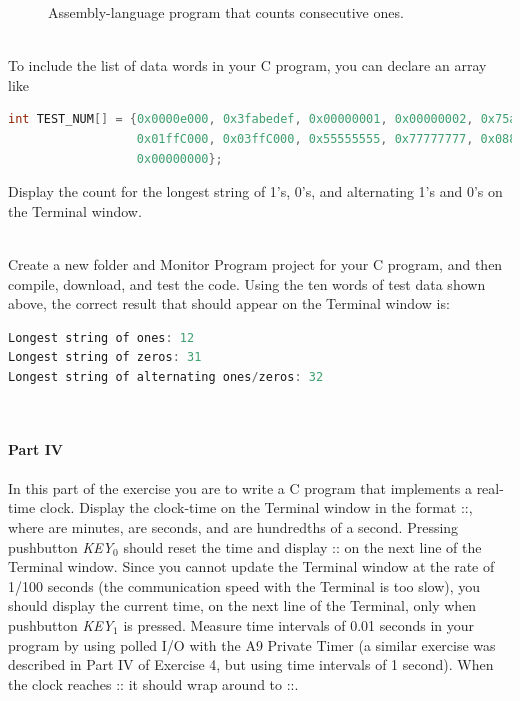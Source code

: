 \documentclass[epsfig,10pt,fullpage]{article}
\begin{document}
\begin{figure}[H]
\begin{center}

\end{center}
\caption{Assembly-language program that counts consecutive ones.}
\label{fig:shiftAND}
\end{figure}

~\\
\noindent
To include the list of data words in your C program, you can declare an array like

\noindent
\begin{lstlisting}[language=C]
int TEST_NUM[] = {0x0000e000, 0x3fabedef, 0x00000001, 0x00000002, 0x75a5a5a5, 
                  0x01ffC000, 0x03ffC000, 0x55555555, 0x77777777, 0x08888888, 
                  0x00000000};
\end{lstlisting}

\noindent
Display the count for the longest string of 1's, 0's, and alternating 1's and 0's
on the Terminal window.

~\\
\noindent
Create a new folder and Monitor Program project for your C program, and then compile,
download, and test the code. Using the ten words of test data shown above, the correct
result that should appear on the Terminal window is:

\begin{lstlisting}[language=C]
Longest string of ones: 12
Longest string of zeros: 31
Longest string of alternating ones/zeros: 32
\end{lstlisting}

~\\
~\\
\noindent
{\bf Part IV}
~\\
~\\
\noindent
In this part of the exercise you are to write a C program that implements a real-time
clock. Display the clock-time on the Terminal window in the format ::, 
where  are minutes,  are seconds, and  are hundredths of 
a second. Pressing pushbutton {\it KEY}$_0$ should reset the time and display 
:: on the next line of the Terminal window. Since you cannot update 
the Terminal window at the rate of 1/100 seconds (the communication speed with the Terminal 
is too slow), you should display the current time, on the next line of the Terminal, only when
pushbutton {\it KEY}$_1$ is pressed. Measure time intervals of 0.01 seconds in your program 
by using polled I/O with the A9 Private Timer (a 
similar exercise was described in Part IV of Exercise 4, but using time intervals of 1 second).
When the clock reaches :: it should wrap around 
to ::.
\end{document}
